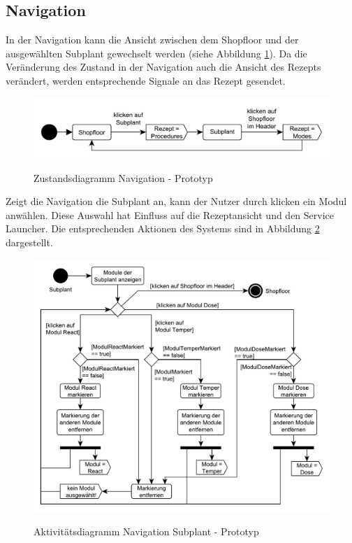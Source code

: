 \subsection{Navigation}
In der Navigation kann die Ansicht zwischen dem Shopfloor und der ausgewählten Subplant  gewechselt werden (siehe Abbildung \ref{pic:Zustandsdiagramm-Navigation}). Da die Veränderung des Zustand in der Navigation auch die Ansicht des Rezepts verändert, werden entsprechende Signale an das Rezept gesendet.
\begin{figure}[htbp]
\centering
\includegraphics[scale=0.65]{DA_files/UML/Prototyp/Zustandsdiagramm-Navigation.pdf}
\label{pic:Zustandsdiagramm-Navigation}
\caption{Zustandsdiagramm Navigation - Prototyp}
\end{figure}

Zeigt die Navigation die Subplant an, kann der Nutzer durch klicken ein Modul anwählen. Diese Auswahl hat Einfluss auf die Rezeptansicht und den Service Launcher. Die entsprechenden Aktionen des Systems sind in Abbildung \ref{pic:Aktivitaetsdiagramm-Navigation-Subplant} dargestellt.
\begin{figure}[htbp]
\centering
\includegraphics[scale=0.6]{DA_files/UML/Prototyp/Aktivitaetsdiagramm-Navigation-Module.pdf}
\label{pic:Aktivitaetsdiagramm-Navigation-Subplant}
\caption{Aktivitätsdiagramm Navigation Subplant - Prototyp}
\end{figure}

